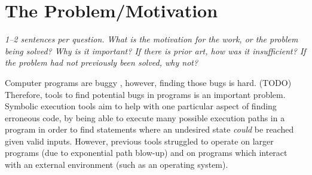 \documentclass[11pt]{article}
\begin{document}
\begin{itemize}






\end{itemize}

\section*{The Problem/Motivation}

\textsl{1--2 sentences per question. What is the motivation for the work, or
the problem being solved? Why is it important? If there is prior art, how was
it insufficient? If the problem had not previously been solved, why not?}

Computer programs are buggy \cite{GitHubBugs}, however, finding those bugs is
hard. (TODO) Therefore, tools to find potential bugs in programs is an
important problem. Symbolic execution tools aim to help with one particular
aspect of finding erroneous code, by being able to execute many possible
execution paths in a program in order to find statements where an undesired
state \textit{could} be reached given valid inputs. However, previous tools
struggled to operate on larger programs (due to exponential path blow-up) and on
programs which interact with an external environment (such as an operating
system).
\end{document}
